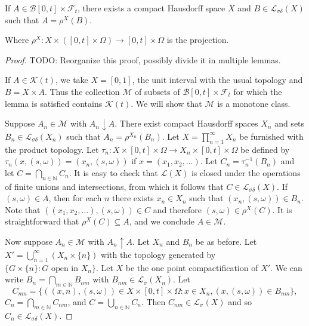\begin{lemma}\label{lem:exists_cpct_Hausdorff}
  \leanok
If $A \in \mathcal{B}[0, t] \times \mathcal{F}_t$, there exists a compact Hausdorff space $X$ and $B \in \mathcal{L}_{\sigma\delta}(X )$ such  that $A = \rho^X (B)$.

Where $\rho^X:X\times ([0,t]\times\Omega)\rightarrow [0,t]\times\Omega$ is the projection.
\end{lemma}

\begin{proof}

  TODO: Reorganize this proof, possibly divide it in multiple lemmas.

  If $A \in \mathcal{K}(t)$, we take $X = [0,1]$, the unit interval with the
  usual topology and $B = X \times A$. Thus the collection $\mathcal{M}$ of
  subsets of $\mathcal{B}[0,t] \times \mathcal{F}_t$
  for which the lemma is satisfied contains $\mathcal{K}(t)$. We will
  show that $\mathcal{M}$ is a monotone class.


  Suppose $A_n \in \mathcal{M}$ with $A_n \downarrow A$. There exist compact Hausdorff
  spaces $X_n$ and sets $B_n \in \mathcal{L}_{\sigma\delta}(X_n)$ such that $A_n = \rho^{X_n}(B_n)$.
  Let $X = \prod_{n=1}^\infty X_n$ be furnished with the product topology. Let
  $\tau_n: X \times [0,t] \times \Omega \to X_n \times [0,t] \times \Omega$ be defined by $\tau_n(x,(s,\omega))
  = (x_n,(s,\omega))$ if $x = (x_1,x_2, \ldots)$. Let $C_n = \tau_n^{-1}(B_n)$
  and let $C = \bigcap_{n \in \mathbb{N}} C_n$. It is easy to check that $\mathcal{L}(X)$ is closed under
  the operations of finite unions and intersections, from which it follows
  that $C \in \mathcal{L}_{\sigma\delta}(X)$. If $(s,\omega) \in A$, then for each $n$ there exists $x_n \in X_n$ such that $(x_n,(s,\omega)) \in B_n$. Note that
  $((x_1,x_2, \ldots),(s,\omega)) \in C$ and therefore $(s,\omega) \in \rho^X(C)$.
  It is straightforward that $\rho^X(C) \subseteq A$, and we conclude
  $A \in \mathcal{M}$.

  Now suppose $A_n \in \mathcal{M}$ with $A_n \uparrow A$. Let $X_n$ and $B_n$ be as before.
  Let $X' = \bigcup_{n=1}^\infty (X_n \times \{n\})$ with the topology generated by
  $\{G \times \{n\}: G \text{ open in } X_n\}$. Let $X$ be the one point
  compactification of $X'$. We can write $B_n = \bigcap_{m \in \mathbb{N}} B_{nm}$ with
  $B_{nm} \in \mathcal{L}_\sigma(X_n)$. Let
  $$C_{nm} = \{((x,n),(s,\omega)) \in X \times [0,t] \times \Omega: x \in X_n, (x,(s,\omega)) \in B_{nm}\},$$
  $C_n = \bigcap_{m \in \mathbb{N}} C_{nm}$, and $C = \bigcup_{n \in \mathbb{N}} C_n$.
  Then $C_{nm} \in \mathcal{L}_\sigma(X)$ and so $C_n \in \mathcal{L}_{\sigma\delta}(X)$.


\end{proof}
